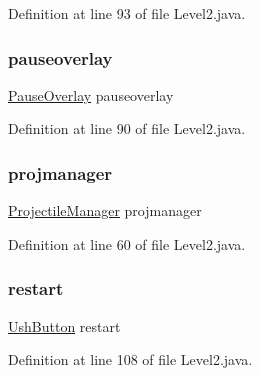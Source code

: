 Definition at line 93 of file Level2.\+java.

\mbox{\label{classscenes_1_1_level2_a544fb9294d892e35b4b0316e07997cd6}} 
\subsubsection{\texorpdfstring{pauseoverlay}{pauseoverlay}}
{\footnotesize\ttfamily \hyperlink{classui_1_1_pause_overlay}{Pause\+Overlay} pauseoverlay\hspace{0.3cm}{\ttfamily [private]}}



Definition at line 90 of file Level2.\+java.

\mbox{\label{classscenes_1_1_level2_aee34cf906685787259a2edd7d4559863}} 
\subsubsection{\texorpdfstring{projmanager}{projmanager}}
{\footnotesize\ttfamily \hyperlink{classmanagers_1_1_projectile_manager}{Projectile\+Manager} projmanager\hspace{0.3cm}{\ttfamily [private]}}



Definition at line 60 of file Level2.\+java.

\mbox{\label{classscenes_1_1_level2_ac1d34384911014e49613ccfb1abddbcc}} 
\subsubsection{\texorpdfstring{restart}{restart}}
{\footnotesize\ttfamily \hyperlink{classui_1_1_ush_button}{Ush\+Button} restart\hspace{0.3cm}{\ttfamily [private]}}



Definition at line 108 of file Level2.\+java.


